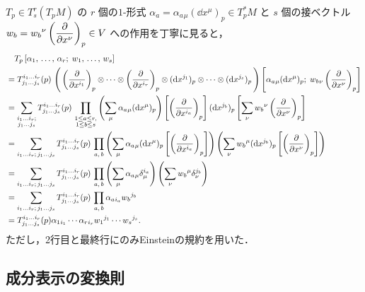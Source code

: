 \documentclass[geometry_main]{subfiles}
\begin{document}
$T_p \in T^r_s(T_p M)$ の $r$ 個の$1$-形式 $\alpha_a = \alpha_a{}_{\mu} (\dd{x^\mu})_p \in T^*_pM$ と $s$ 個の接ベクトル $\displaystyle w_b = w_b{}^\nu \left(\pdv{}{x^{\nu}}\right)_p \in V$ への作用を丁寧に見ると，
\begin{align} 
	&\quad T_p \left[ \alpha_1,\, \dots ,\, \alpha_r ;\; w_1,\, \dots ,\, w_s \right] \\
	&= T^{i_1 \dots i_r}_{j_1 \dots j_s}(p)\, \left(\, \left(\pdv{}{x^{i_1}}\right)_p \otimes \cdots \otimes \left(\pdv{}{x^{i_r}}\right)_p \otimes (\dd{x^{j_1}})_p \otimes \cdots \otimes (\dd{x^{j_s}})_p \, \right)\left[ \alpha_a{}_{\mu} (\dd{x^\mu})_p;\;  w_b{}_\nu \left(\pdv{}{x^{\nu}}\right)_p \right] \\
	&= \sum_{\substack{ i_1 \dots i_r;\\ j_1 \dots j_s}} T^{i_1 \dots i_r}_{j_1 \dots j_s}(p)\, \prod_{\substack{1 \le a \le r,\\ 1 \le b \le s}} \left( \sum_{\mu} \alpha_a{}_{\mu} (\dd{x^\mu})_p \right) \left[  \left(\pdv{}{x^{i_a}}\right)_p \right] (\dd{x^{j_b}})_p  \left[ \sum_{\nu} w_b{}^\nu \left(\pdv{}{x^{\nu}}\right)_p \right] \\
	&= \sum_{i_1 \dots i_r;\, j_1 \dots j_s} T^{i_1 \dots i_r}_{j_1 \dots j_s}(p)\, \prod_{a,\, b}	\left( \sum_{\mu}\alpha_a{}_{\mu} (\dd{x^\mu})_p \left[  \left(\pdv{}{x^{i_a}}\right)_p \right]\right) \left( \sum_{\nu} w_b{}^\mu (\dd{x^{j_b}})_p  \left[ \left(\pdv{}{x^{\nu}}\right)_p \right]\right) \\
	&= \sum_{i_1 \dots i_r;\, j_1 \dots j_s} T^{i_1 \dots i_r}_{j_1 \dots j_s}(p)\, \prod_{a,\, b} \left( \sum_{\mu}\alpha_a{}_{\mu}\delta_\mu^{i_a} \right) \left( \sum_{\nu} w_b{}^\mu \delta^{j_b}_{\nu} \right)\\
	&= \sum_{i_1 \dots i_r;\, j_1 \dots j_s} T^{i_1 \dots i_r}_{j_1 \dots j_s}(p)\, \prod_{a,\, b} \alpha_a{}_{i_a}  w_b{}^{j_b} \\
	&= T^{i_1 \dots i_r}_{j_1 \dots j_s}(p) \alpha_1{}_{i_1} \cdots \alpha_r{}_{i_r}  w_1{}^{j_1} \cdots w_s{}^{j_s}. \label{eq.31-1}
\end{align}
ただし，2行目と最終行にのみEinsteinの規約を用いた．

\subsection{成分表示の変換則}
\end{document}

